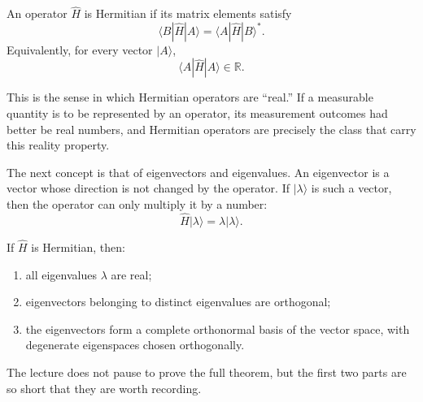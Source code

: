 \begin{definition}
An operator \(\hat H\) is Hermitian if its matrix elements satisfy
\begin{equation}
\langle B|\hat H|A\rangle = \langle A|\hat H|B\rangle^*.
\end{equation}
Equivalently, for every vector \(|A\rangle\),
\begin{equation}
\langle A|\hat H|A\rangle \in \mathbb{R}.
\end{equation}
\end{definition}

This is the sense in which Hermitian operators are ``real.'' If a measurable quantity is to be represented by an operator, its measurement outcomes had better be real numbers, and Hermitian operators are precisely the class that carry this reality property.

The next concept is that of eigenvectors and eigenvalues. An eigenvector is a vector whose direction is not changed by the operator. If \(|\lambda\rangle\) is such a vector, then the operator can only multiply it by a number:
\begin{equation}
\hat H|\lambda\rangle = \lambda |\lambda\rangle.
\end{equation}

\begin{theorem}
If \(\hat H\) is Hermitian, then:
\begin{enumerate}
\item all eigenvalues \(\lambda\) are real;
\item eigenvectors belonging to distinct eigenvalues are orthogonal;
\item the eigenvectors form a complete orthonormal basis of the vector space, with degenerate eigenspaces chosen orthogonally.
\end{enumerate}
\end{theorem}

The lecture does not pause to prove the full theorem, but the first two parts are so short that they are worth recording.

